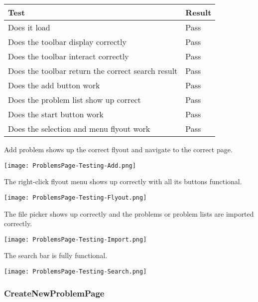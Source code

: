 \documentclass[report.tex]{subfiles}
\begin{document}
\begin{tabulary}{\linewidth}{|L|l|}
    \hline
    Test & Result \\
    \hline
    Does it load & Pass \\
    \hline
    Does the toolbar display correctly & Pass \\
    \hline
    Does the toolbar interact correctly & Pass \\
    \hline
    Does the toolbar return the correct search result & Pass \\
    \hline
    Does the add button work & Pass \\
    \hline
    Does the problem list show up correct & Pass \\
    \hline
    Does the start button work & Pass \\
    \hline
    Does the selection and menu flyout work & Pass \\
    \hline
\end{tabulary}

Add problem shows up the correct flyout and navigate to the correct page.

\texttt{[image: ProblemsPage-Testing-Add.png]}

The right-click flyout menu shows up correctly with all its buttons functional.

\texttt{[image: ProblemsPage-Testing-Flyout.png]}

The file picker shows up correctly and the problems or problem lists are imported correctly.

\texttt{[image: ProblemsPage-Testing-Import.png]}

The search bar is fully functional.

\texttt{[image: ProblemsPage-Testing-Search.png]}

\subsubsection{CreateNewProblemPage}
\end{document}
